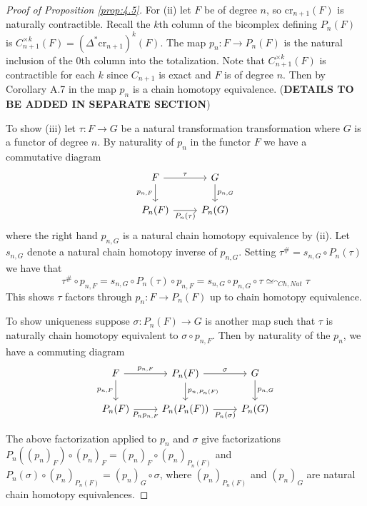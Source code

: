 \begin{proof}[Proof of Proposition \ref{prop:4.5}]
    \vspace{10pt}

    For (ii) let $F$ be of degree $n$, so $\text{cr}_{n+1}(F)$ is naturally contractible. Recall the $k$th column of the bicomplex defining $P_n(F)$ is $C_{n+1}^{\times k}(F) = (\Delta^*\text{cr}_{n+1})^k(F)$. The map $p_n:F\rightarrow P_n(F)$ is the natural inclusion of the $0$th column into the totalization. Note that $C_{n+1}^{\times k}(F)$ is contractible for each $k$ since $C_{n+1}$ is exact and $F$ is of degree $n$. Then by Corollary A.7 in \cite{BJORT} the map $p_n$ is a  chain homotopy equivalence. (\textbf{DETAILS TO BE ADDED IN SEPARATE SECTION})

    \vspace{10pt}

    To show (iii) let $\tau:F\rightarrow G$ be a natural transformation transformation where $G$ is a functor of degree $n$. By naturality of $p_n$ in the functor $F$ we have a commutative diagram
    \[\begin{tikzcd}
    	F & G \\
    	{P_n(F)} & {P_n(G)}
    	\arrow["\tau", from=1-1, to=1-2]
    	\arrow["{P_n(\tau)}"', from=2-1, to=2-2]
    	\arrow["{p_{n,F}}"', from=1-1, to=2-1]
    	\arrow["{p_{n,G}}", from=1-2, to=2-2]
    \end{tikzcd}\]
    where the right hand $p_{n,G}$ is a natural chain homotopy equivalence by (ii). Let $s_{n,G}$ denote a natural chain homotopy inverse of $p_{n,G}$. Setting $\tau^\# = s_{n,G}\circ P_n(\tau)$ we have that
    \begin{equation*}
        \tau^\#\circ p_{n,F} = s_{n,G}\circ P_n(\tau)\circ p_{n,F} = s_{n,G}\circ p_{n,G}\circ \tau \simeq_{\cat{Ch},Nat} \tau
    \end{equation*}
    This shows $\tau$ factors through $p_n:F\rightarrow P_n(F)$ up to  chain homotopy equivalence. 
    
    
    To show uniqueness suppose $\sigma:P_n(F)\rightarrow G$ is another map such that $\tau$ is naturally chain homotopy equivalent to $\sigma\circ p_{n,F}$. Then by naturality of the $p_n$, we have a commuting diagram
    \[\begin{tikzcd}
    	F & {P_n(F)} & G \\
    	{P_n(F)} & {P_n(P_n(F))} & {P_n(G)}
    	\arrow["{p_{n,F}}"', from=1-1, to=2-1]
    	\arrow["{P_np_{n,F}}"', from=2-1, to=2-2]
    	\arrow["{p_{n,F}}", from=1-1, to=1-2]
    	\arrow["{p_{n,P_n(F)}}", from=1-2, to=2-2]
    	\arrow["\sigma", from=1-2, to=1-3]
    	\arrow["{p_{n,G}}", from=1-3, to=2-3]
    	\arrow["{P_n(\sigma)}"', from=2-2, to=2-3]
    \end{tikzcd}\]
    
    
    The above factorization applied to $p_n$ and $\sigma$ give factorizations $P_n((p_n)_F)\circ (p_n)_F = (p_n)_F\circ (p_n)_{P_n(F)}$ and $P_n(\sigma)\circ (p_n)_{P_n(F)}=(p_n)_G\circ \sigma$, where $(p_n)_{P_n(F)}$ and $(p_n)_G$ are natural chain homotopy equivalences. 
\end{proof}

